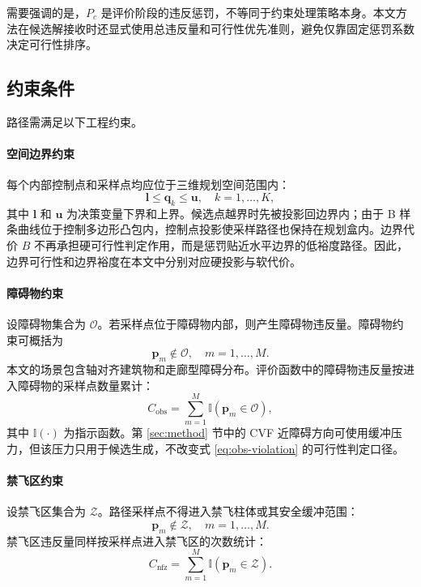 需要强调的是，$P_c$ 是评价阶段的违反惩罚，不等同于约束处理策略本身。本文方法在候选解接收时还显式使用总违反量和可行性优先准则，避免仅靠固定惩罚系数决定可行性排序。

\subsection{约束条件}

路径需满足以下工程约束。

\paragraph{空间边界约束}
每个内部控制点和采样点均应位于三维规划空间范围内：
\begin{equation}
    \mathbf{l}\leq \mathbf{q}_k \leq \mathbf{u}, \quad k=1,\ldots,K,
    \label{eq:box-bound-control}
\end{equation}
其中 $\mathbf{l}$ 和 $\mathbf{u}$ 为决策变量下界和上界。候选点越界时先被投影回边界内；由于 B 样条曲线位于控制多边形凸包内，控制点投影使采样路径也保持在规划盒内。边界代价 $B$ 不再承担硬可行性判定作用，而是惩罚贴近水平边界的低裕度路径。因此，边界可行性和边界裕度在本文中分别对应硬投影与软代价。

\paragraph{障碍物约束}
设障碍物集合为 $\mathcal{O}$。若采样点位于障碍物内部，则产生障碍物违反量。障碍物约束可概括为
\begin{equation}
    \mathbf{p}_m \notin \mathcal{O}, \quad m=1,\ldots,M.
    \label{eq:obstacle-constraint}
\end{equation}
本文的场景包含轴对齐建筑物和走廊型障碍分布。评价函数中的障碍物违反量按进入障碍物的采样点数量累计：
\begin{equation}
    C_{\mathrm{obs}}=
    \sum_{m=1}^{M}\mathbb{I}(\mathbf p_m\in\mathcal O),
    \label{eq:obs-violation}
\end{equation}
其中 $\mathbb{I}(\cdot)$ 为指示函数。第 \ref{sec:method} 节中的 CVF 近障碍方向可使用缓冲压力，但该压力只用于候选生成，不改变式 \eqref{eq:obs-violation} 的可行性判定口径。

\paragraph{禁飞区约束}
设禁飞区集合为 $\mathcal{Z}$。路径采样点不得进入禁飞柱体或其安全缓冲范围：
\begin{equation}
    \mathbf{p}_m \notin \mathcal{Z}, \quad m=1,\ldots,M.
    \label{eq:nfz-constraint}
\end{equation}
禁飞区违反量同样按采样点进入禁飞区的次数统计：
\begin{equation}
    C_{\mathrm{nfz}}=
    \sum_{m=1}^{M}\mathbb{I}(\mathbf p_m\in\mathcal Z).
    \label{eq:nfz-violation}
\end{equation}

